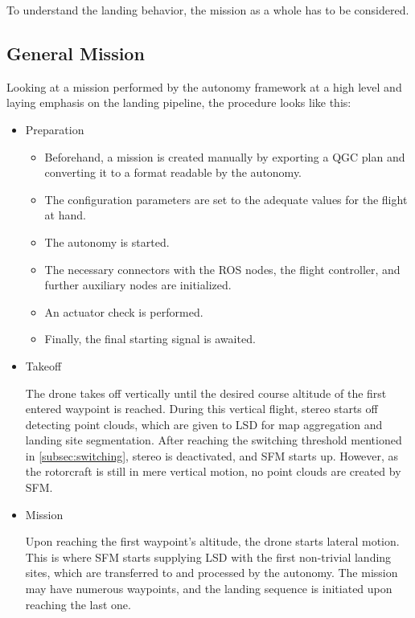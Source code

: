 To understand the landing behavior, the mission as a whole has to be considered.

\subsection{General Mission}

Looking at a mission performed by the autonomy framework at a high level and laying emphasis on the landing pipeline, the procedure looks like this:

\begin{itemize}
    \item Preparation
    
        \begin{itemize}
            \item Beforehand, a mission is created manually by exporting a QGC plan and converting it to a format readable by the autonomy.
            \item The configuration parameters are set to the adequate values for the flight at hand.
            \item The autonomy is started.
            \item The necessary connectors with the ROS nodes, the flight controller, and further auxiliary nodes are initialized.
            \item An actuator check is performed.
            \item Finally, the final starting signal is awaited.
        \end{itemize}
        

    \item Takeoff
    
    The drone takes off vertically until the desired course altitude of the first entered waypoint is reached. During this vertical flight, stereo starts off detecting point clouds, which are given to LSD for map aggregation and landing site segmentation. After reaching the switching threshold mentioned in \cref{subsec:switching}, stereo is deactivated, and SFM starts up. However, as the rotorcraft is still in mere vertical motion, no point clouds are created by SFM.

    \item Mission

    Upon reaching the first waypoint's altitude, the drone starts lateral motion. This is where SFM starts supplying LSD with the first non-trivial landing sites, which are transferred to and processed by the autonomy. The mission may have numerous waypoints, and the landing sequence is initiated upon reaching the last one.


\end{itemize}
